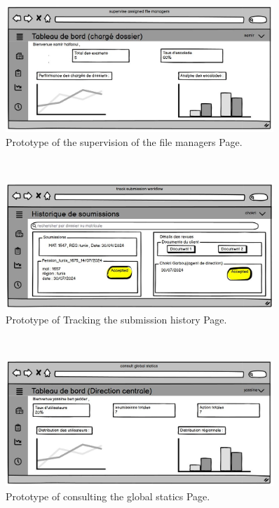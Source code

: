  \begin{figure}[h]
    \centering
    \includegraphics[width=0.9\textwidth]{figures/supervise assigned file managers.JPG} 
    \caption{Prototype of the supervision of the file managers Page.}
\end{figure}\
 \begin{figure}[h]
    \centering
    \includegraphics[width=0.9\textwidth]{figures/track sub workflow.JPG} 
    \caption{Prototype of Tracking the submission history Page.}
\end{figure}\
 \begin{figure}[h!]
    \centering
    \includegraphics[width=0.9\textwidth]{figures/consult global statics.JPG}  %
    \caption{Prototype of consulting the global statics Page.}
\end{figure}\

